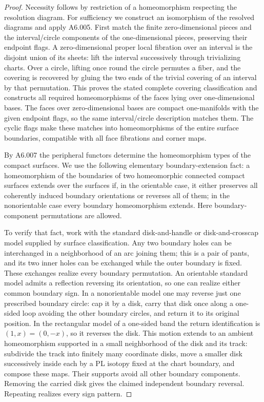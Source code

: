\begin{proof}
Necessity follows by restriction of a homeomorphism respecting the
resolution diagram. For sufficiency we construct an isomorphism
of the resolved diagrams and apply A6.005. First match the finite
zero-dimensional pieces and the interval/circle components of the
one-dimensional pieces, preserving their endpoint flags. A
zero-dimensional proper local fibration over an interval is the
disjoint union of its sheets: lift the interval successively through
trivializing charts. Over a circle, lifting once round the circle
permutes a fiber, and the covering is recovered by gluing the two
ends of the trivial covering of an interval by that permutation.
This proves the stated complete covering classification and
constructs all required homeomorphisms of the faces lying over
one-dimensional bases. The faces over zero-dimensional bases
are compact one-manifolds with the given endpoint flags, so the
same interval/circle description matches them. The cyclic flags
make these matches into homeomorphisms of the entire surface
boundaries, compatible with all face fibrations and corner maps.

By A6.007 the peripheral functors determine the homeomorphism
types of the compact surfaces. We use the following elementary
boundary-extension fact: a homeomorphism of the boundaries of
two homeomorphic connected compact surfaces extends over the
surfaces if, in the orientable case, it either preserves all
coherently induced boundary orientations or reverses all of them;
in the nonorientable case every boundary homeomorphism extends.
Here boundary-component permutations are allowed.

To verify that fact, work with the standard disk-and-handle or
disk-and-crosscap model supplied by surface classification.
Any two boundary holes can be interchanged in a neighborhood
of an arc joining them; this is a pair of pants, and its two
inner holes can be exchanged while the outer boundary is fixed.
These exchanges realize every boundary permutation. An orientable
standard model admits a reflection reversing its orientation, so
one can realize either common boundary sign. In a nonorientable
model one may reverse just one prescribed boundary circle:
cap it by a disk, carry that disk once along a one-sided loop
avoiding the other boundary circles, and return it to its original
position. In the rectangular model of a one-sided band the return
identification is $(1,x)=(0,-x)$, so it reverses the disk. This
motion extends to an ambient homeomorphism supported in a small
neighborhood of the disk and its track: subdivide the track into
finitely many coordinate disks, move a smaller disk successively
inside each by a PL isotopy fixed at the chart boundary, and
compose these maps. Their supports avoid all other boundary
components. Removing the carried disk gives the claimed independent
boundary reversal. Repeating realizes every sign pattern.


\end{proof}
